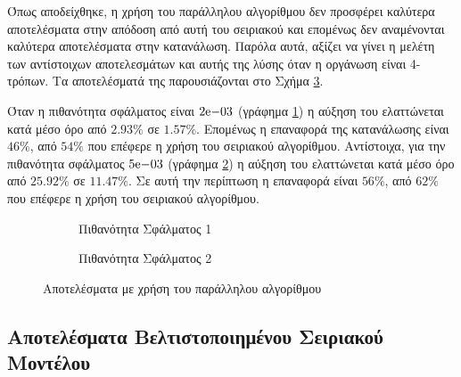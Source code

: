 Όπως αποδείχθηκε, η χρήση του παράλληλου αλγορίθμου δεν προσφέρει καλύτερα αποτελέσματα στην απόδοση από αυτή του σειριακού και επομένως δεν αναμένονται καλύτερα αποτελέσματα στην κατανάλωση. Παρόλα αυτά, αξίζει να γίνει η μελέτη των αντίστοιχων αποτελεσμάτων και αυτής της λύσης όταν η οργάνωση είναι 4-τρόπων. Τα αποτελέσματά της παρουσιάζονται στο Σχήμα \ref{fig:chap6_parallel_4way_edp}.
\par
Όταν η πιθανότητα σφάλματος είναι $2\mathrm{e}{-03}$ (γράφημα \ref{fig:chap6_parallel_4way_pail1_edp}) η αύξηση του \edp ελαττώνεται κατά μέσο όρο από $2.93\%$ σε $1.57\%$. Επομένως η επαναφορά της κατανάλωσης είναι $46\%$, από $54\%$ που επέφερε η χρήση του σειριακού αλγορίθμου. Αντίστοιχα, για την πιθανότητα σφάλματος $5\mathrm{e}{-03}$ (γράφημα \ref{fig:chap6_parallel_4way_pail2_edp}) η αύξηση του \edp ελαττώνεται κατά μέσο όρο από $25.92\%$ σε $11.47\%$. Σε αυτή την περίπτωση η επαναφορά είναι $56\%$, από $62\%$ που επέφερε η χρήση του σειριακού αλγορίθμου.

\begin{figure}[!t]
    \centering
    \begin{subfigure}[t]{\textwidth}
        \centering
        \caption{Πιθανότητα Σφάλματος 1}
        \label{fig:chap6_parallel_4way_pail1_edp}
    \end{subfigure}
    
    \begin{subfigure}[t]{\textwidth}
        \centering
        \caption{Πιθανότητα Σφάλματος 2}
        \label{fig:chap6_parallel_4way_pail2_edp}
    \end{subfigure}
    \caption{Αποτελέσματα με χρήση του παράλληλου αλγορίθμου}
    \label{fig:chap6_parallel_4way_edp}
\end{figure}


\subsection{Αποτελέσματα Βελτιστοποιημένου Σειριακού Μοντέλου}
\label{chap6_mcpatOptimizedSerialAlgResults}

